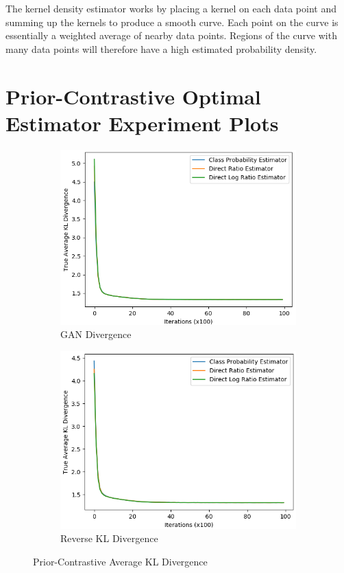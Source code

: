 \documentclass[honours,12pt]{unswthesis}
\numberwithin{equation}{section}
\theoremstyle{definition}
\begin{document}
The kernel density estimator works by placing a kernel on each data point and summing up the kernels to produce a smooth curve. Each point on the curve is essentially a weighted average of nearby data points. Regions of the curve with many data points will therefore have a high estimated probability density.
\chapter{Prior-Contrastive Optimal Estimator Experiment Plots}\label{app:E}
\begin{figure}[h]
\centering
\begin{subfigure}{0.33\textwidth}
\centering
\includegraphics[width=\linewidth]{truklmins/PCADVvsPCADVexpvsPCADVgudlog.png}
\caption{GAN Divergence}
\end{subfigure}
\begin{subfigure}{0.33\textwidth}
\centering
\includegraphics[width=\linewidth]{truklmins/PCKLDvsPCKLexpvsPCKLgudlog.png}
\caption{Reverse KL Divergence}
\end{subfigure}
\caption{Prior-Contrastive Average KL Divergence}
\end{figure}
\end{document}
